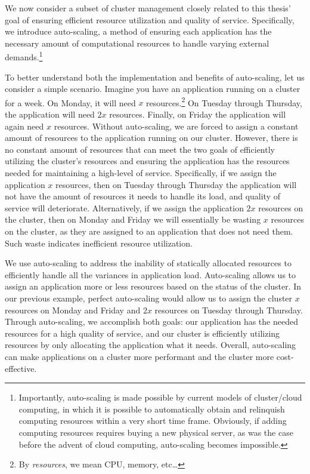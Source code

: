 We now consider a subset of cluster management closely related to
this thesis' goal of ensuring efficient resource utilization and quality of
service. Specifically, we introduce
auto-scaling, a method of ensuring each application has the necessary amount
of computational resources to handle varying external
demands.\footnote{Importantly, auto-scaling is
made possible by current models of cluster/cloud computing, in which it is
possible to automatically obtain and relinquish computing resources within a
very short time frame. Obviously, if adding computing resources requires buying
a new physical server, as was the case before the advent of cloud computing,
auto-scaling becomes impossible.}

To better understand both the implementation and benefits of auto-scaling, let
us consider a simple scenario. Imagine you have an application running on a
cluster for a week. On Monday, it will need $x$ resources.\footnote{By
  \textit{resources}, we mean CPU, memory, etc\ldots} On Tuesday through
Thursday, the application will need $2x$ resources. Finally, on Friday the
application will again need $x$ resources. Without auto-scaling, we are forced
to assign a constant amount of resources to the application running on our
cluster. However, there is no constant amount of resources that can meet
the two goals of efficiently utilizing the cluster's resources and ensuring the
application has the resources needed for maintaining a high-level of service.
Specifically, if we assign the application $x$ resources,
then on Tuesday through Thursday the
application will not have the amount of resources it needs to handle its load,
and quality of service will deteriorate. Alternatively, if we assign the
application $2x$ resources on the cluster, then on Monday and Friday we will
essentially be wasting $x$ resources on the cluster, as they are assigned to an
application that does not need them. Such waste indicates inefficient
resource utilization.

We use auto-scaling to address the inability of statically allocated
resources to efficiently handle all the variances in application load.
Auto-scaling allows us to assign an application more or less resources based on
the status of the cluster. In our previous example, perfect auto-scaling
would allow us to assign the cluster $x$ resources on Monday and Friday and
$2x$ resources on Tuesday through Thursday. Through auto-scaling, we accomplish
both goals: our application has the needed resources for a high quality
of service, and our cluster is efficiently utilizing resources by only
allocating the application what it needs.
Overall, auto-scaling can make applications on a cluster more performant and
the cluster more cost-effective.

